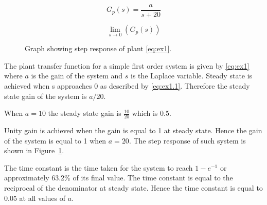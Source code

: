 \renewcommand{\ex}{ex1} 

\begin{equation}
    G_{p}\left(s\right)=\frac{a}{s+20}
    \label{eq:\ex}
\end{equation}

\begin{equation}
    \lim_{s\to0}\left(G_{p}\left(s\right)\right)
    \label{eq:\ex.1}
\end{equation}

\begin{figure}[ht!]
    \centering
    
    \caption{Graph showing step response of plant \eqref{eq:\ex}. \appendixamble{\ex}}
    \label{fig:\ex}
\end{figure}\FloatBarrier

The plant transfer function for a simple first order system is given by \eqref{eq:\ex} where $a$ is the gain of the system and $s$ is the Laplace variable. Steady state is achieved when s approaches 0 as described by \eqref{eq:\ex.1}. Therefore the steady state gain of the system is $a/20$.

When $a=10$ the steady state gain is $\frac{10}{20}$ which is $0.5$.

Unity gain is achieved when the gain is equal to 1 at steady state. Hence the gain of the system is equal to 1 when $a=20$. The step response of such system is shown in Figure~\ref{fig:\ex}.

The time constant is the time taken for the system to reach $1-e^{-1}$ or approximately 63.2\% of its final value. The time constant is equal to the reciprocal of the denominator at steady state. Hence the time constant is equal to 0.05 at all values of $a$.




